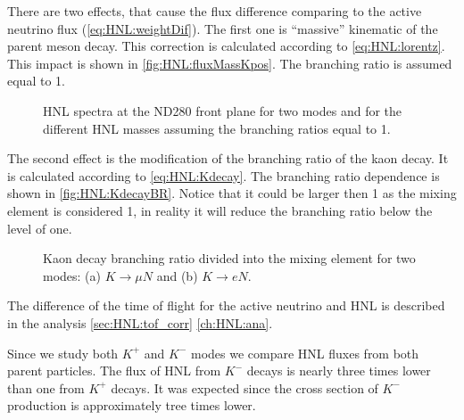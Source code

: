 \documentclass[../main.tex]{subfiles}
\begin{document}
There are two effects, that cause the flux difference comparing to the active neutrino flux (\autoref{eq:HNL:weightDif}). The first one is ``massive'' kinematic of the parent meson decay. This correction is calculated according to \autoref{eq:HNL:lorentz}. This impact is shown in \autoref{fig:HNL:fluxMassKpos}. The branching ratio is assumed equal to 1.
\begin{figure}[!ht]
    \begin{minipage}{0.49\linewidth}
    \end{minipage}
    \hfill
    \begin{minipage}{0.49\linewidth}
    \end{minipage}
    \caption{HNL spectra at the ND280 front plane for two modes and for the different HNL masses assuming the branching ratios equal to 1.}
    \label{fig:HNL:fluxMassKpos}
\end{figure}

The second effect is the modification of the branching ratio of the kaon decay. It is calculated according to \autoref{eq:HNL:Kdecay}. The branching ratio dependence is shown in \autoref{fig:HNL:KdecayBR}. Notice that it could be larger then 1 as the mixing element is considered 1, in reality it will reduce the branching ratio below the level of one.
\begin{figure}[!ht]
    \begin{minipage}[!ht]{0.49\linewidth}
    \end{minipage}
    \hfill
    \begin{minipage}[!ht]{0.49\linewidth}
    \end{minipage}
    \caption{Kaon decay branching ratio divided into the mixing element for two modes: (a) $K\to \mu N$ and (b) $K\to eN$.}
    \label{fig:HNL:KdecayBR}
\end{figure}

The difference of the time of flight for the active neutrino and HNL is described in the analysis \autoref{sec:HNL:tof_corr} \autoref{ch:HNL:ana}.

Since we study both $K^+$ and $K^-$ modes we compare HNL fluxes from both parent particles. The flux of HNL from $K^-$ decays is nearly three times lower than one from $K^+$ decays. It was expected since the cross section of $K^-$ production is approximately  tree times lower.
\end{document}
